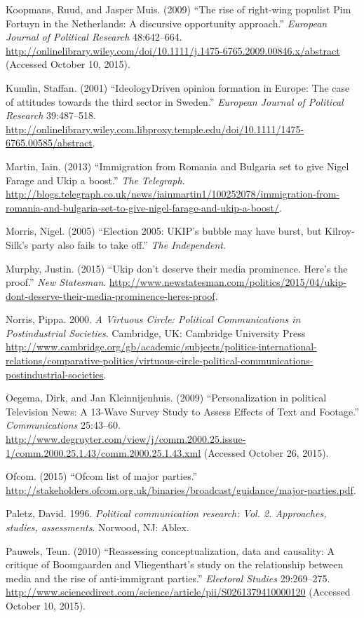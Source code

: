 \documentclass[12pt,article]{article}
\begin{document}
Koopmans, Ruud, and Jasper Muis. (2009) ``The rise of right-wing
populist Pim Fortuyn in the Netherlands: A discursive opportunity
approach.'' \emph{European Journal of Political Research} 48:642--664.
\url{http://onlinelibrary.wiley.com/doi/10.1111/j.1475-6765.2009.00846.x/abstract}
(Accessed October 10, 2015).

Kumlin, Staffan. (2001) ``IdeologyDriven opinion formation in Europe:
The case of attitudes towards the third sector in Sweden.''
\emph{European Journal of Political Research} 39:487--518.
\url{http://onlinelibrary.wiley.com.libproxy.temple.edu/doi/10.1111/1475-6765.00585/abstract}.

Martin, Iain. (2013) ``Immigration from Romania and Bulgaria set to give
Nigel Farage and Ukip a boost.'' \emph{The Telegraph}.
\url{http://blogs.telegraph.co.uk/news/iainmartin1/100252078/immigration-from-romania-and-bulgaria-set-to-give-nigel-farage-and-ukip-a-boost/}.

Morris, Nigel. (2005) ``Election 2005: UKIP's bubble may have burst, but
Kilroy-Silk's party also fails to take off.'' \emph{The Independent}.

Murphy, Justin. (2015) ``Ukip don't deserve their media prominence.
Here's the proof.'' \emph{New Statesman}.
\url{http://www.newstatesman.com/politics/2015/04/ukip-dont-deserve-their-media-prominence-heres-proof}.

Norris, Pippa. 2000. \emph{A Virtuous Circle: Political Communications
in Postindustrial Societies}. Cambridge, UK: Cambridge University Press
\url{http://www.cambridge.org/gb/academic/subjects/politics-international-relations/comparative-politics/virtuous-circle-political-communications-postindustrial-societies}.

Oegema, Dirk, and Jan Kleinnijenhuis. (2009) ``Personalization in
political Television News: A 13-Wave Survey Study to Assess Effects of
Text and Footage.'' \emph{Communications} 25:43--60.
\url{http://www.degruyter.com/view/j/comm.2000.25.issue-1/comm.2000.25.1.43/comm.2000.25.1.43.xml}
(Accessed October 26, 2015).

Ofcom. (2015) ``Ofcom list of major parties.''
\url{http://stakeholders.ofcom.org.uk/binaries/broadcast/guidance/major-parties.pdf}.

Paletz, David. 1996. \emph{Political communication research: Vol. 2.
Approaches, studies, assessments}. Norwood, NJ: Ablex.

Pauwels, Teun. (2010) ``Reassessing conceptualization, data and
causality: A critique of Boomgaarden and Vliegenthart's study on the
relationship between media and the rise of anti-immigrant parties.''
\emph{Electoral Studies} 29:269--275.
\url{http://www.sciencedirect.com/science/article/pii/S0261379410000120}
(Accessed October 10, 2015).
\end{document}
